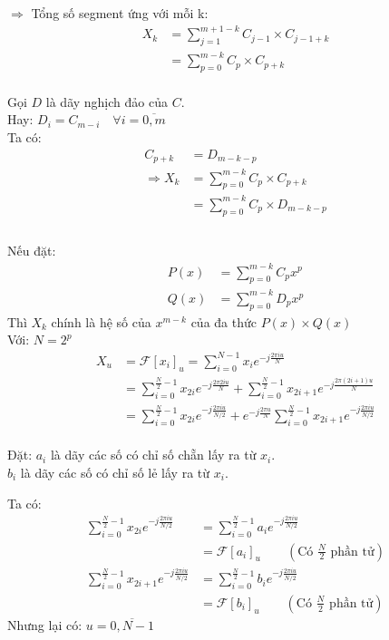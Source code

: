 \documentclass[12pt]{report}
\begin{document}
\noindent $\Rightarrow$ Tổng số segment ứng với mỗi k:
\begin{align*}
    X_k &= \sum_{j = 1}^{m + 1 - k} C_{j - 1} \times C_{j - 1 + k}  \\
    &= \sum_{p = 0}^{m - k} C_{p} \times C_{p + k} 
\end{align*}\\[1cm]

\noindent Gọi $D$ là dãy nghịch đảo của $C$. \\
Hay: $D_i = C_{m - i} \quad\forall i = \overline{0, m}$ \\
Ta có:
\begin{align*}
    C_{p + k} &= D_{m - k - p} \\
    \Rightarrow X_k &= \sum_{p = 0}^{m - k} C_{p} \times C_{p + k}\\
    &= \sum_{p = 0}^{m - k} C_{p} \times D_{m - k - p}\\
\end{align*}\\[1cm]

\noindent Nếu đặt:
\begin{align*}
    P(x) &= \sum_{p = 0}^{m - k} C_p x^p \\
    Q(x) &= \sum_{p = 0}^{m - k} D_p x^p
\end{align*}
Thì $X_k$ chính là hệ số của $x^{m - k}$ của đa thức 
$P(x) \times Q(x)$ \\[1cm]


\noindent Với:  $N = 2^p$
\begin{align*}
    X_u &= \mathcal{F}[x_i]_u = \sum_{i = 0}^{N - 1} x_i 
    e^{-j\frac{2\pi i u}{N}} \\
    &= \sum_{i = 0}^{\frac{N}{2} - 1} x_{2i} e^{-j\frac{2\pi 2 i u}{N}}
    + \sum_{i = 0}^{\frac{N}{2} - 1} x_{2i + 1} 
    e^{-j\frac{2\pi (2i + 1) u}{N}} \\
    &= \sum_{i = 0}^{\frac{N}{2} - 1} x_{2i} e^{-j\frac{2\pi i u}{N/2}}
    + e^{-j\frac{2\pi u}{N}} 
    \sum_{i = 0}^{\frac{N}{2} - 1} x_{2i+ 1} 
    e^{-j\frac{2\pi i u}{N / 2}}
\end{align*}\\[1cm]

\noindent Đặt: $a_i$ là dãy các số có chỉ số chẵn lấy ra từ $x_i$. \\
\hspace*{22pt} $b_i$ là dãy các số có chỉ số lẻ lấy ra từ $x_i$.

\noindent Ta có: 
\begin{align*}
    \sum_{i = 0}^{\frac{N}{2} - 1} x_{2i} e^{-j\frac{2\pi i u}{N/2}}
    &= \sum_{i = 0}^{\frac{N}{2} - 1} a_i e^{-j\frac{2\pi i u}{N/2}} \\
    &= \mathcal{F}[a_i]_u 
    \quad\quad\left(\textrm{Có }\frac{N}{2}\textrm{ phần tử}\right) \\
    \sum_{i = 0}^{\frac{N}{2} - 1} x_{2i + 1} e^{-j\frac{2\pi i u}{N/2}}
    &= \sum_{i = 0}^{\frac{N}{2} - 1} b_i e^{-j\frac{2\pi i u}{N/2}} \\
    &= \mathcal{F}[b_i]_u
    \quad\quad\left(\textrm{Có }\frac{N}{2}\textrm{ phần tử}\right)
\end{align*}
Nhưng lại có: $u = \overline{0, N - 1}$ \\[1cm]
\end{document}

